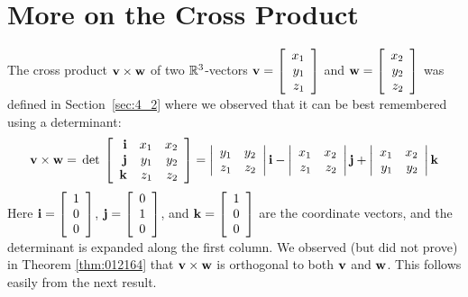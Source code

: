 \section{More on the Cross Product}
\label{sec:4_3}

The cross product $\textbf{v} \times \textbf{w}$ of two $\mathbb{R}^3$-vectors $\textbf{v} = \left[
\begin{array}{r}
x_{1}\\
y_{1}\\
z_{1}
\end{array}
\right]$ and $\textbf{w} = \left[
\begin{array}{r}
x_{2}\\
y_{2}\\
z_{2}
\end{array}
\right]$
 was defined in Section~\ref{sec:4_2} where we observed that it can be best remembered using a determinant:
\begin{equation} \label{eq:crossPdeterminant}
\textbf{v} \times \textbf{w} = \thinspace\operatorname{det\medspace}\left[
\begin{array}{rrr}
\textbf{i} & x_{1} & x_{2}\\
\textbf{j} & y_{1} & y_{2}\\
\textbf{k} & z_{1} & z_{2}
\end{array}
\right]
=
\left|
\begin{array}{rr}
y_{1} & y_{2}\\
z_{1} & z_{2}
\end{array}
\right|\textbf{i}
-
\left|
\begin{array}{rr}
x_{1} & x_{2}\\
z_{1} & z_{2}
\end{array}
\right|\textbf{j}
+
\left|
\begin{array}{rr}
x_{1} & x_{2}\\
y_{1} & y_{2}
\end{array}
\right|\textbf{k}
\end{equation}
Here $\textbf{i} = \left[
\begin{array}{r}
1\\
0\\
0
\end{array}
\right]$, 
$\textbf{j} = \left[
\begin{array}{r}
0\\
1\\
0
\end{array}
\right]$, and
$\textbf{k} = \left[
\begin{array}{r}
1\\
0\\
0
\end{array}
\right]$ are the coordinate vectors, and the determinant is expanded along the first column. We observed (but did not prove) in Theorem \ref{thm:012164} that $\textbf{v} \times \textbf{w}$ is orthogonal to both $\textbf{v}$ and $\textbf{w}$. This follows easily from the next result.


